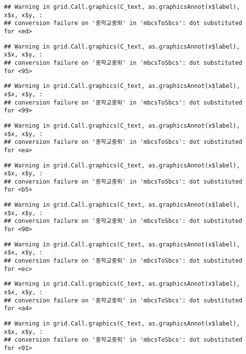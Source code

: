 \documentclass[
]{article}
\begin{document}
\begin{verbatim}
## Warning in grid.Call.graphics(C_text, as.graphicsAnnot(x$label), x$x, x$y, :
## conversion failure on '중학교중퇴' in 'mbcsToSbcs': dot substituted for <ed>
\end{verbatim}

\begin{verbatim}
## Warning in grid.Call.graphics(C_text, as.graphicsAnnot(x$label), x$x, x$y, :
## conversion failure on '중학교중퇴' in 'mbcsToSbcs': dot substituted for <95>
\end{verbatim}

\begin{verbatim}
## Warning in grid.Call.graphics(C_text, as.graphicsAnnot(x$label), x$x, x$y, :
## conversion failure on '중학교중퇴' in 'mbcsToSbcs': dot substituted for <99>
\end{verbatim}

\begin{verbatim}
## Warning in grid.Call.graphics(C_text, as.graphicsAnnot(x$label), x$x, x$y, :
## conversion failure on '중학교중퇴' in 'mbcsToSbcs': dot substituted for <ea>
\end{verbatim}

\begin{verbatim}
## Warning in grid.Call.graphics(C_text, as.graphicsAnnot(x$label), x$x, x$y, :
## conversion failure on '중학교중퇴' in 'mbcsToSbcs': dot substituted for <b5>
\end{verbatim}

\begin{verbatim}
## Warning in grid.Call.graphics(C_text, as.graphicsAnnot(x$label), x$x, x$y, :
## conversion failure on '중학교중퇴' in 'mbcsToSbcs': dot substituted for <90>
\end{verbatim}

\begin{verbatim}
## Warning in grid.Call.graphics(C_text, as.graphicsAnnot(x$label), x$x, x$y, :
## conversion failure on '중학교중퇴' in 'mbcsToSbcs': dot substituted for <ec>
\end{verbatim}

\begin{verbatim}
## Warning in grid.Call.graphics(C_text, as.graphicsAnnot(x$label), x$x, x$y, :
## conversion failure on '중학교중퇴' in 'mbcsToSbcs': dot substituted for <a4>
\end{verbatim}

\begin{verbatim}
## Warning in grid.Call.graphics(C_text, as.graphicsAnnot(x$label), x$x, x$y, :
## conversion failure on '중학교중퇴' in 'mbcsToSbcs': dot substituted for <91>
\end{verbatim}
\end{document}
